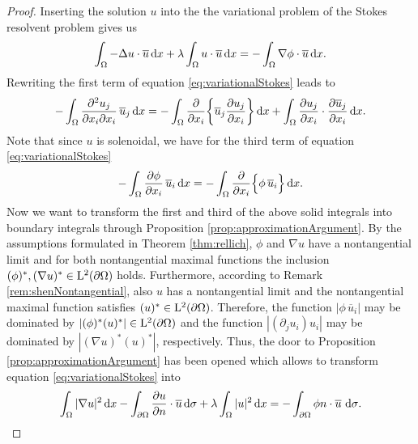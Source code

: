 \begin{proof}
  Inserting the solution $u$ into the the variational problem of the Stokes resolvent problem gives us
  \begin{align}
    \label{eq:variationalStokes}
    \int_\Omega -\Delta u \cdot \overline u \, {\operatorname{d}\!{x}} + \lambda \int_\Omega u \cdot \overline u \, {\operatorname{d}\!{x}}= - \int_\Omega \nabla \phi \cdot \overline u \, {\operatorname{d}\!{x}}.
  \end{align}
  Rewriting the first term of equation \eqref{eq:variationalStokes} leads to 
  \begin{align*}
    -\int_{\Omega}  \frac{\partial^2 u_j}{\partial x_i \partial x_i}  \, \overline u_j \, {\operatorname{d}\!{x}}
    = -\int_{\Omega}  \frac{\partial }{\partial x_i} \bigg\{ \overline u_j \frac{\partial u_j}{\partial x_i} \bigg\} \, {\operatorname{d}\!{x}} + \int_\Omega \frac{\partial u_j}{\partial x_i} \cdot \frac{\partial \overline u_j}{\partial x_i} \, {\operatorname{d}\!{x}}.
    \end{align*}
  Note that since $u$ is solenoidal, we have for the third term of equation \eqref{eq:variationalStokes}
  \begin{align*}
    - \int_{\Omega} \frac{\partial \phi}{\partial x_i} \, \overline u_i \, {\operatorname{d}\!{x}} = - \int_{\Omega} \frac{\partial}{\partial x_i} \Big\{ \phi\,  \overline u_i \Big\} \, {\operatorname{d}\!{x}}.
  \end{align*}
  Now we want to transform the first and third of the above solid integrals into boundary integrals through Proposition \ref{prop:approximationArgument}.
  By the assumptions formulated in Theorem \ref{thm:rellich}, $\phi$ and $\nabla u$ have a nontangential limit and for both nontangential maximal functions the inclusion $(\phi)^*, (\nabla u)^* \in \mathrm{L}^2(\partial\Omega)$ holds. 
  Furthermore, according to Remark \ref{rem:shenNontangential}, also $u$ has a nontangential limit and the nontangential maximal function satisfies $(u)^* \in \mathrm{L}^2(\partial\Omega)$. 
  Therefore, the function $|\phi\,  \overline u_i |$ may be dominated by $|(\phi)^* (u)^*| \in \mathrm{L}^2(\partial\Omega)$ and the function $|(\partial_j u_i) u_i|$ may be dominated by $|(\nabla u)^* (u)^*|$, respectively. Thus, the door to Proposition \ref{prop:approximationArgument} has been opened which allows to transform equation \eqref{eq:variationalStokes} into
  \begin{align*}
    \int_\Omega |\nabla u|^2 \, {\operatorname{d}\!{x}} - \int_{\partial\Omega} \frac{\partial u}{\partial n} \cdot \overline u \, {\operatorname{d}\!{\sigma}} + \lambda \int_\Omega |u|^2 \, {\operatorname{d}\!{x}} = - \int_{\partial\Omega}  \phi n \cdot \overline u \, \, {\operatorname{d}\!{\sigma}}.
  \end{align*}

\end{proof}
